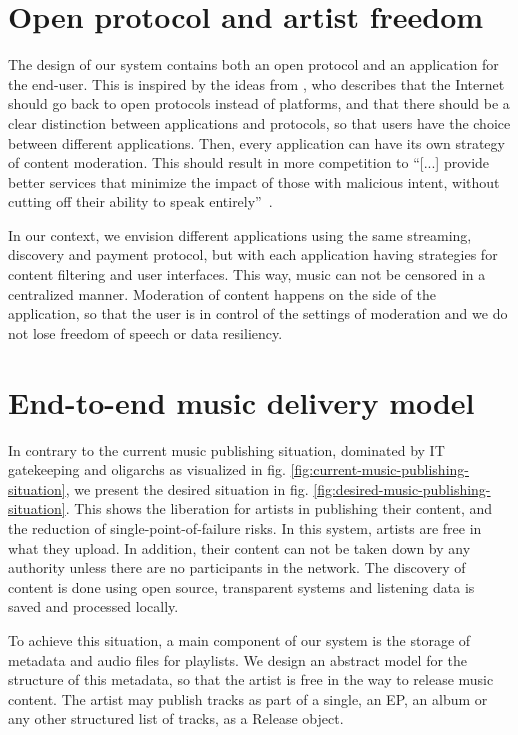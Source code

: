 \section{Open protocol and artist freedom}
The design of our system contains both an open protocol and an application for the end-user. This is inspired by the ideas from \cite{masnick2019protocols}, who describes that the Internet should go back to open protocols instead of platforms, and that there should be a clear distinction between applications and protocols, so that users have the choice between different applications. Then, every application can have its own strategy of content moderation. This should result in more competition to ``[...] provide better services that minimize the impact of those
with malicious intent, without cutting off their ability to speak entirely''~\citep{masnick2019protocols}.

In our context, we envision different applications using the same streaming, discovery and payment protocol, but with each application having strategies for content filtering and user interfaces. This way, music can not be censored in a centralized manner. Moderation of content happens on the side of the application, so that the user is in control of the settings of moderation and we do not lose freedom of speech or data resiliency.

\section{End-to-end music delivery model}
\label{sec:release-model}
In contrary to the current music publishing situation, dominated by IT gatekeeping and oligarchs as visualized in fig. \ref{fig:current-music-publishing-situation}, we present the desired situation in fig. \ref{fig:desired-music-publishing-situation}. This shows the liberation for artists in publishing their content, and the reduction of single-point-of-failure risks. In this system, artists are free in what they upload. In addition, their content can not be taken down by any authority unless there are no participants in the network. The discovery of content is done using open source, transparent systems and listening data is saved and processed locally.

To achieve this situation, a main component of our system is the storage of metadata and audio files for playlists. We design an abstract model for the structure of this metadata, so that the artist is free in the way to release music content. The artist may publish tracks as part of a single, an EP, an album or any other structured list of tracks, as a Release object.

